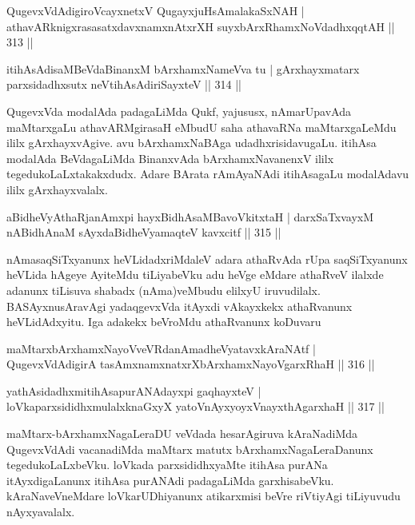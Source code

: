 \begin{shl}
QugevxVdAdigiroVcayxnetxV QugayxjuHsAmalakaSxNAH |
athavARknigxrasasatxdavxnamxnAtxrXH suyxbArxRhamxNoVdadhxqqtAH \hfill || 313 ||
\end{shl}

\begin{shl}
itihAsAdisaMBeVdaBinanxM bArxhamxNameVva tu |
gArxhayxmatarx parxsidadhxsutx neVtihAsAdiriSayxteV \hfill || 314 ||
\end{shl}

\begin{artha}
QugevxVda modalAda padagaLiMda Qukf, yajususx, nAmarUpavAda maMtarxgaLu athavARMgirasaH eMbudU saha athavaRNa maMtarxgaLeMdu ililx gArxhayxvAgive. avu bArxhamxNaBAga udadhxrisidavugaLu. itihAsa modalAda BeVdagaLiMda BinanxvAda bArxhamxNavanenxV ililx tegedukoLaLxtakakxdudx. Adare BArata rAmAyaNAdi itihAsagaLu modalAdavu ililx gArxhayxvalalx.
\end{artha}


\begin{shl}
aBidheVyAthaRjanAmxpi hayxBidhAsaMBavoVkitxtaH |
darxSaTxvayxM nABidhAnaM sAyxdaBidheVyamaqteV kavxcitf \hfill || 315 ||
\end{shl}

\begin{artha}
nAmasaqSiTxyanunx heVLidadxriMdaleV adara athaRvAda rUpa saqSiTxyanunx heVLida hAgeye AyiteMdu tiLiyabeVku adu heVge eMdare athaRveV ilalxde adanunx tiLisuva shabadx (nAma)veMbudu elilxyU iruvudilalx. BASAyxnusAravAgi yadaqgevxVda itAyxdi vAkayxkekx athaRvanunx heVLidAdxyitu. Iga adakekx beVroMdu athaRvanunx koDuvaru \mdash 
\end{artha}

\begin{shl}
maMtarxbArxhamxNayoVveVRdanAmadheVyatavxkAraNAtf |
QugevxVdAdigirA tasAmxnamxnatxrXbArxhamxNayoVgarxRhaH \hfill || 316 ||
\end{shl}

\begin{shl}
yathAsidadhxmitihAsapurANAdayxpi gaqhayxteV |
loVkaparxsididhxmulalxknaGxyX yatoV\s nAyxyoyxV\s nayxthAgarxhaH \hfill || 317 ||
\end{shl}

\begin{artha}
maMtarx-bArxhamxNagaLeraDU veVdada hesarAgiruva kAraNadiMda QugevxVdAdi vacanadiMda maMtarx matutx bArxhamxNagaLeraDanunx tegedukoLaLxbeVku. loVkada parxsididhxyaMte itihAsa purANa itAyxdigaLanunx itihAsa purANAdi padagaLiMda garxhisabeVku. kAraNaveVneMdare loVkarUDhiyanunx atikarxmisi beVre riVtiyAgi tiLiyuvudu nAyxyavalalx.
\end{artha}

